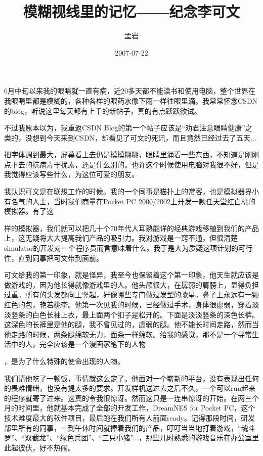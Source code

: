 \documentclass{article}
\title{模糊视线里的记忆——纪念李可文}
\author{孟岩}
\date{2007-07-22}
\begin{document}

\maketitle


\Large

﻿6月中旬以来我的眼睛就一直有病，近20多天都不能读书和使用电脑，整个世界在我眼睛里都是模糊的，各种各样的眼药水像下雨一样往眼里滴。我常常怀念CSDN的blog，听说这里每天都有上千的新帖子，真的有点跃跃欲试。

不过我原本以为，我重返CSDN Blog的第一个帖子应该是“劝君注意眼睛健康”之类的，没想到今天来到CSDN，却看见了可文的死讯，而且竟然已经过去了五天...

把字体调到最大，屏幕看上去仍是模模糊糊，眼睛里涌着一些东西，不知道是刚刚点下去的抗病毒干扰素，还是什么别的。也许这个时候使用电脑对我很不好，但是我觉得应该写些什么，为这位可爱的朋友。

我认识可文是在联想工作的时候。我的一个同事是猫扑上的常客，也是模拟器界小有名气的人士，当时我们商量在Pocket PC 2000/2002上开发一款任天堂红白机的模拟器。有了这

\newpage 

样的模拟器，我们就可以把几十个70年代人耳熟能详的经典游戏移植到我们的产品上，这无疑将大大提高我们产品的吸引力。我对游戏是一窍不通，但很清楚simulator的开发对一个程序员而言意味着什么。我于是大为质疑这项计划的可行性，直到同事把可文带到面前。

可文给我的第一印象，就是怪异，我至今也保留着这个第一印象，他天生就应该是做游戏的，因为他长得就像游戏里的人。他头颅很大，在孱弱的肩膀上，显得负担过重。所有的头发都向上竖起，好像哪些专门做过发型的歌星。鼻子上永远有一颗红色的包，艳若桃李。他第一次见我的时候，已经做过手术，身体很虚弱，穿着淡淡竖条的白色长袖上衣，最上面两个扣子是松开的。下面是淡淡竖条的深色长裤。这深色的长裤里是他的腿，我不曾见过的，虚弱的腿。他不能长时间走路，然而当他走路的时候，两条腿绵软无力，面条一样绵软。给我的感觉，那不是一个寻常生活中的人，完全应该是一个漫画家笔下的人物

\newpage 

，是为了什么特殊的使命出现的人物。

我们请他吃了一顿饭，事情就这么定了。他面对一个崭新的平台，没有表现出任何的畏难情绪，也没有提太多的要求。开发样机送过去之后不久，一个可以run起来的程序就寄了过来。这真的令我很惊讶。然而这只是一连串惊讶的开始。在两三个月的时间里，他就基本完成了全部的开发工作，DreamNES for Pocket PC，这个技术难度最大的软件项目，最后跑在我们所有人前面ready。记得那段时间，研发部里所有的同事，一到午休时间就捧着我们的产品，叮叮当当地打着游戏，“魂斗罗”、“双截龙”、“绿色兵团”、“三只小猪”...，那些儿时熟悉的游戏音乐在办公室里此起彼伏，好不热闹。
\end{document}
